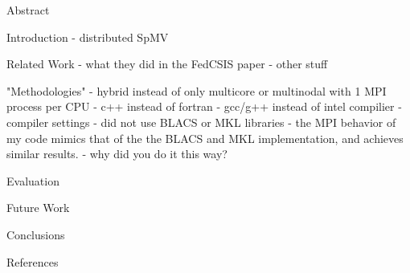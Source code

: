 

Abstract

Introduction
	- distributed SpMV
	

Related Work
	- what they did in the FedCSIS paper
	- other stuff
	
"Methodologies"
	- hybrid instead of only multicore or multinodal with 1 MPI process per CPU
	- c++ instead of fortran
	- gcc/g++ instead of intel compilier
	- compiler settings
	- did not use BLACS or MKL libraries
	- the MPI behavior of my code mimics that of the the BLACS and MKL implementation, and achieves similar results.
		- why did you do it this way?
	 
	


Evaluation

Future Work

Conclusions

References
